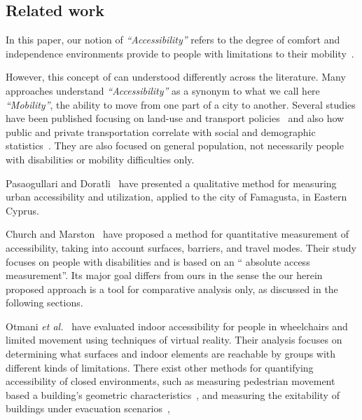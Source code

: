 \documentclass[12pt]{article}
\begin{document}

\subsection{Related work}
In this paper, our notion of \emph{``Accessibility''} refers to
the degree of comfort and independence environments provide
to people with limitations to their mobility~\cite{fange2003accessibility, otmani2009new}.

However, this concept of can understood differently across the literature.
Many approaches understand \emph{``Accessibility''} as a synonym to what we call here \emph{``Mobility''},
the ability to move from one part of a city to another.
Several studies have been published focusing on land-use and transport policies~\cite{Pirie:1979, Niemeier}
and also how public and private transportation correlate with social and demographic statistics~\cite{KREMPI:2004}.
They are also focused on general population, not necessarily people with disabilities or mobility difficulties only.

Pasaogullari and Doratli~\cite{PASAOGULLARI2004225}
have presented a qualitative method for measuring urban accessibility and utilization,
applied to the city of Famagusta, in Eastern Cyprus.

Church and Marston~\cite{church-marston} have proposed a method
for quantitative measurement of accessibility,
taking into account surfaces, barriers, and travel modes.
Their study focuses on people with disabilities and
is based on an `` absolute access measurement''.
Its major goal differs from ours in the sense the our herein proposed approach is
a tool for comparative analysis only, as discussed in the following sections.

Otmani \emph{et al.}~\cite{otmani2009new} have evaluated indoor accessibility for
people in wheelchairs and limited movement using techniques of virtual reality.
Their analysis focuses on determining what surfaces and indoor elements are reachable
by groups with different kinds of limitations.
There exist other methods for quantifying accessibility of closed environments,
such as measuring pedestrian movement based a building's geometric characteristics~\cite{jeonnongindoor, thill2011traveling},
and measuring the exitability of buildings under evacuation scenarios~\cite{vanclooster2012measuring},
\end{document}
